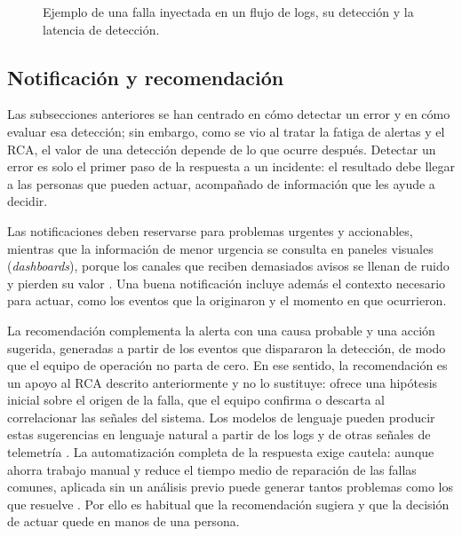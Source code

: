 \begin{figure}[H]
\centering

\caption{Ejemplo de una falla inyectada en un flujo de logs, su detección y la latencia de detección.}
\label{fig:ant_inyeccion}
\end{figure}

\subsection{Notificación y recomendación}\label{sec:mt_reaccion}

Las subsecciones anteriores se han centrado en cómo detectar un error y en cómo evaluar esa detección; sin embargo, como se vio al tratar la fatiga de alertas y el RCA, el valor de una detección depende de lo que ocurre después. Detectar un error es solo el primer paso de la respuesta a un incidente: el resultado debe llegar a las personas que pueden actuar, acompañado de información que les ayude a decidir.

Las notificaciones deben reservarse para problemas urgentes y accionables, mientras que la información de menor urgencia se consulta en paneles visuales (\textit{dashboards}), porque los canales que reciben demasiados avisos se llenan de ruido y pierden su valor \cite{ewaschuk2016_sre_monitoring}. Una buena notificación incluye además el contexto necesario para actuar, como los eventos que la originaron y el momento en que ocurrieron.

La recomendación complementa la alerta con una causa probable y una acción sugerida, generadas a partir de los eventos que dispararon la detección, de modo que el equipo de operación no parta de cero. En ese sentido, la recomendación es un apoyo al RCA descrito anteriormente y no lo sustituye: ofrece una hipótesis inicial sobre el origen de la falla, que el equipo confirma o descarta al correlacionar las señales del sistema. Los modelos de lenguaje pueden producir estas sugerencias en lenguaje natural a partir de los logs y de otras señales de telemetría \cite{wang2025_cloudnative_rca}. La automatización completa de la respuesta exige cautela: aunque ahorra trabajo manual y reduce el tiempo medio de reparación de las fallas comunes, aplicada sin un análisis previo puede generar tantos problemas como los que resuelve \cite{murphy2016_sre_automation}. Por ello es habitual que la recomendación sugiera y que la decisión de actuar quede en manos de una persona.

